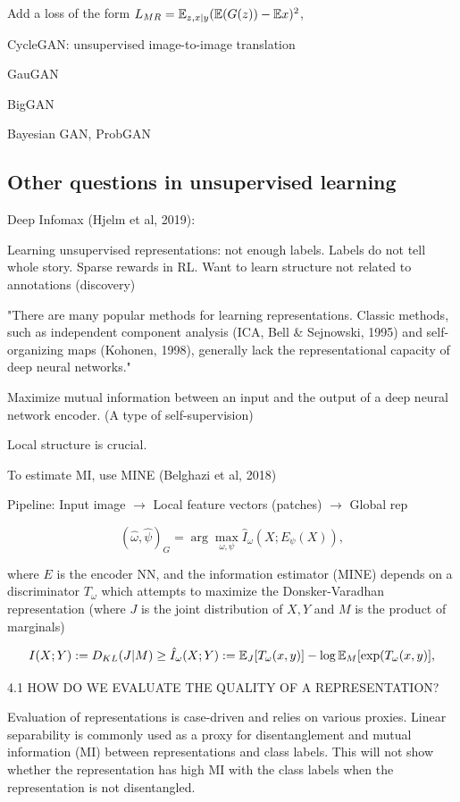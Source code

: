 \documentclass[english]{article}
\begin{document}
Add a loss of the form $L_{MR} = \mathbb{E}_{z,x|y}(\mathbb{E}(G(z)) - \mathbb{E} x)^2$,

\item 

CycleGAN: unsupervised image-to-image translation

GauGAN

BigGAN
 
Bayesian GAN, ProbGAN

\eenum 

\subsection{Other questions in unsupervised learning}

\benum 
\item Deep Infomax (Hjelm et al, 2019): 

Learning unsupervised representations: not enough labels. Labels do not tell whole story. Sparse rewards in RL. Want to learn structure not related to annotations (discovery)

"There are many popular methods for learning representations. Classic methods, such as independent
component analysis (ICA, Bell \& Sejnowski, 1995) and self-organizing maps (Kohonen, 1998),
generally lack the representational capacity of deep neural networks."



Maximize mutual information between an input and the output of a deep neural network encoder. (A type of self-supervision)

Local structure is crucial. 

To estimate MI, use MINE (Belghazi et al, 2018)

Pipeline: Input image $\to$ Local feature vectors (patches) $\to$ Global rep

$$(\hat \omega,\hat \psi)_G 
= \arg\max_{\omega,\psi}
\hat I_{\omega}(X;E_\psi(X)),$$ 

where $E$ is the encoder NN, and the information estimator (MINE) depends on a discriminator $T_\omega$ which attempts to maximize the Donsker-Varadhan representation (where $J$ is the joint distribution of $X,Y$ and $M$ is the product of marginals)

$$I(X;Y) := D_{KL}(J|M) \ge \hat I_\omega(X;Y) 
:= \mathbb{E}_J[T_\omega (x,y)] - \log \mathbb{E}_M [\exp(T_\omega(x,y)],$$ 

4.1 HOW DO WE EVALUATE THE QUALITY OF A REPRESENTATION?

Evaluation of representations is case-driven and relies on various proxies. Linear separability is
commonly used as a proxy for disentanglement and mutual information (MI) between representations
and class labels.  This will not show whether the representation has high MI with
the class labels when the representation is not disentangled.
\end{document}
